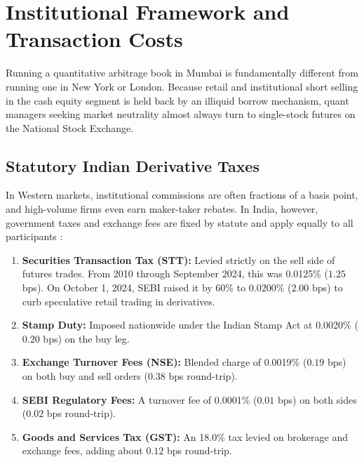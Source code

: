 \section{Institutional Framework and Transaction Costs}
\label{sec:microstructure}

Running a quantitative arbitrage book in Mumbai is fundamentally different from running one in New York or London. Because retail and institutional short selling in the cash equity segment is held back by an illiquid borrow mechanism, quant managers seeking market neutrality almost always turn to single-stock futures on the National Stock Exchange.

\subsection{Statutory Indian Derivative Taxes}
In Western markets, institutional commissions are often fractions of a basis point, and high-volume firms even earn maker-taker rebates. In India, however, government taxes and exchange fees are fixed by statute and apply equally to all participants \citep{bose2007securities}:
\begin{enumerate}
    \item \textbf{Securities Transaction Tax (STT):} Levied strictly on the sell side of futures trades. From 2010 through September 2024, this was 0.0125\% ($1.25$ bps). On October 1, 2024, SEBI raised it by 60\% to 0.0200\% ($2.00$ bps) to curb speculative retail trading in derivatives.
    \item \textbf{Stamp Duty:} Imposed nationwide under the Indian Stamp Act at 0.0020\% ($0.20$ bps) on the buy leg.
    \item \textbf{Exchange Turnover Fees (NSE):} Blended charge of 0.0019\% ($0.19$ bps) on both buy and sell orders ($0.38$ bps round-trip).
    \item \textbf{SEBI Regulatory Fees:} A turnover fee of 0.0001\% ($0.01$ bps) on both sides ($0.02$ bps round-trip).
    \item \textbf{Goods and Services Tax (GST):} An 18.0\% tax levied on brokerage and exchange fees, adding about $0.12$ bps round-trip.
\end{enumerate}

